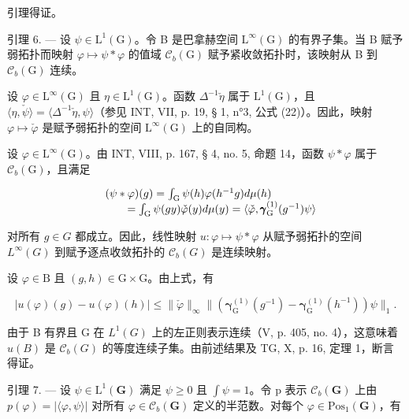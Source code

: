 引理得证。

引理 6. --- 设 \(\psi \in \mathrm{L}^{1}(\mathrm{G})\)。令 B 是巴拿赫空间 \(\mathrm{L}^{\infty}(\mathrm{G})\) 的有界子集。当 B 赋予弱拓扑而映射 \(\varphi \mapsto \psi * \varphi\) 的值域 \(\mathcal{C}_b(\mathrm{G})\) 赋予紧收敛拓扑时，该映射从 B 到 \(\mathcal{C}_b(\mathrm{G})\) 连续。

设 \(\varphi\in\mathrm{L}^{\infty}(\mathrm{G})\) 且 \(\eta\in\mathrm{L}^{1}(\mathrm{G})\)。函数 \(\Delta^{-1}\check{\eta}\) 属于 \(\mathrm{L}^{1}(\mathrm{G})\)，且 \(\langle\eta,\check{\psi}\rangle=\langle\Delta^{-1}\check{\eta},\psi\rangle\)（参见 INT, VII, p. 19, § 1, n°3, 公式 (22)）。因此，映射 \(\varphi\mapsto\check{\varphi}\) 是赋予弱拓扑的空间 \(\mathrm{L}^{\infty}(\mathrm{G})\) 上的自同构。

设 \(\varphi\in\mathrm{L}^{\infty}(\mathrm{G})\)。由 INT, VIII, p. 167, § 4, no. 5, 命题 14，函数 \(\psi*\varphi\) 属于 \(\mathcal{C}_{b}(\mathrm{G})\)，且满足

\[
\begin{array}{r l} & {(\psi * \varphi) (g) = \int_ {\mathrm{G}} \psi (h) \varphi (h ^ {- 1} g) d \mu (h)} \\ & {\qquad = \int_ {\mathrm{G}} \psi (g y) \check {\varphi} (y) d \mu (y) = \langle \check {\varphi}, \pmb {\gamma} _ {\mathrm{G}} ^ {(1)} (g ^ {- 1}) \psi \rangle} \end{array}
\]

对所有 \(g \in G\) 都成立。因此，线性映射 \(u: \varphi \mapsto \psi * \varphi\) 从赋予弱拓扑的空间 \(L^{\infty}(G)\) 到赋予逐点收敛拓扑的 \(\mathcal{C}_{b}(G)\) 是连续映射。

设 \(\varphi\in\mathrm{B}\) 且 \((g,h)\in\mathrm{G}\times\mathrm{G}\)。由上式，有

\[
| u (\varphi) (g) - u (\varphi) (h) | \leqslant \| \check {\varphi} \| _ {\infty} \| (\boldsymbol {\gamma} _ {\mathrm{G}} ^ {(1)} (g ^ {- 1}) - \boldsymbol {\gamma} _ {\mathrm{G}} ^ {(1)} (h ^ {- 1})) \psi \| _ {1}.
\]

由于 B 有界且 G 在 \(L^{1}(G)\) 上的左正则表示连续（V, p. 405, no. 4），这意味着 \(u(B)\) 是 \(\mathcal{C}_{b}(G)\) 的等度连续子集。由前述结果及 TG, X, p. 16, 定理 1，断言得证。

引理 7. --- 设 \(\psi \in \mathrm{L}^1 (\mathbf{G})\) 满足 \(\psi \geqslant 0\) 且 \(\int \psi = 1\)。令 p 表示 \(\mathcal{C}_b(\mathbf{G})\) 上由 \(p(\varphi) = |\langle \varphi ,\psi \rangle |\) 对所有 \(\varphi \in \mathcal{C}_b(\mathbf{G})\) 定义的半范数。对每个 \(\varphi \in \mathrm{Pos}_1(\mathbf{G})\)，有

